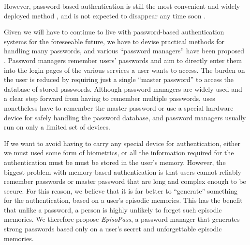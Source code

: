 \documentclass[runningheads,a4paper]{llncs}
\begin{document}

However, password-based authentication is still the most
convenient and widely deployed method \cite{Bonneau:ReplacePasswords},
and is not expected to disappear any time soon \cite{Herley:2009:PSS:1601990.1602010}.

Given we will have to continue to live with password-based authentication systems for the foreseeable future,
we have to devise practical methods for handling many passwords, and various ``password managers'' have been proposed
\cite{OnePassword,Dashlane,MilPass,LastPass,KeyPass,NortonIDSafe,IDManager}.
%
Password managers remember users' passwords and aim to directly enter them into the login pages of the various services a user wants to access.
%
The burden on the user is reduced by requiring just a single ``master password'' to access the database of stored passwords.
%
Although password managers are widely used and a clear step forward from having to remember multiple passwords, uses nonetheless have to remember the master password or use a special hardware device for safely handling the password database, and password managers usually run on only a limited set of devices.

%

If we want to avoid having to carry any special device for authentication,
either we must used some form of biometrics, or all the information required 
for the authentication must be
must be stored in the user's memory.
%
However, the biggest problem with memory-based authentication is that
users cannot reliably remember passwords or master password that are long and complex enough to be secure.
For this reason, we believe that
it is far better to ``generate'' something for the authentication,
based on a user's episodic memories. This has the benefit that unlike a password, a person is highly unlikely to forget such episodic memories.
%
%
We therefore propose \textit{EpisoPass}, a password manager that generates strong passwords
based only on a user's secret and unforgettable episodic memories.
\end{document}

